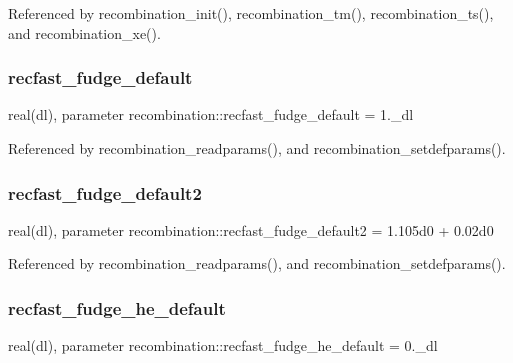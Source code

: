 Referenced by recombination\+\_\+init(), recombination\+\_\+tm(), recombination\+\_\+ts(), and recombination\+\_\+xe().

\mbox{\label{namespacerecombination_a198e64f2c7a763d928e647b4e1de4be9}} 
\subsubsection{\texorpdfstring{recfast\+\_\+fudge\+\_\+default}{recfast\_fudge\_default}}
{\footnotesize\ttfamily real(dl), parameter recombination\+::recfast\+\_\+fudge\+\_\+default = 1.\+\_\+dl\hspace{0.3cm}{\ttfamily [private]}}



Referenced by recombination\+\_\+readparams(), and recombination\+\_\+setdefparams().

\mbox{\label{namespacerecombination_afe0b5ce72921eaef12df437e7c994273}} 
\subsubsection{\texorpdfstring{recfast\+\_\+fudge\+\_\+default2}{recfast\_fudge\_default2}}
{\footnotesize\ttfamily real(dl), parameter recombination\+::recfast\+\_\+fudge\+\_\+default2 = 1.\+105d0 + 0.\+02d0\hspace{0.3cm}{\ttfamily [private]}}



Referenced by recombination\+\_\+readparams(), and recombination\+\_\+setdefparams().

\mbox{\label{namespacerecombination_ae732fad2453ab4c2e0a7ba4c6e5cca43}} 
\subsubsection{\texorpdfstring{recfast\+\_\+fudge\+\_\+he\+\_\+default}{recfast\_fudge\_he\_default}}
{\footnotesize\ttfamily real(dl), parameter recombination\+::recfast\+\_\+fudge\+\_\+he\+\_\+default = 0.\+\_\+dl\hspace{0.3cm}{\ttfamily [private]}}



